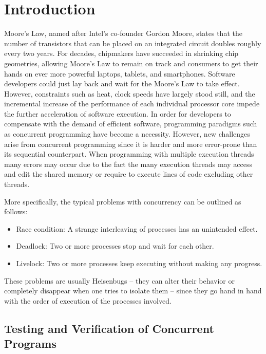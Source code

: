 \chapter{Introduction}

Moore's Law, named after Intel's co-founder Gordon Moore, states that the number of transistors that can be placed on an integrated circuit doubles
roughly every two years. For decades, chipmakers have succeeded in shrinking chip geometries, allowing Moore's Law to remain on track and consumers to 
get their hands on ever more powerful laptops, tablets, and smartphones. Software developers could just lay back and wait for the Moore's Law to take effect.
However, constraints such as heat, clock speeds have largely stood still, and the incremental increase of the performance of each individual 
processor core impede the further acceleration of software execution. In order for developers to compensate with the demand of efficient software, programming paradigms such
as concurrent programming have become a necessity. However, new challenges arise from concurrent programming since it is harder and more
error-prone than its sequential counterpart. When programming with multiple execution threads many errors may occur due to the fact the many execution threads 
may access and edit the shared memory or require to execute lines of code excluding other threads.

More specifically, the typical problems with concurrency can be outlined as follows:
\begin{itemize}
\item Race condition: A strange interleaving of processes has an unintended effect.
\item Deadlock: Two or more processes stop and wait for each other.
\item Livelock: Two or more processes keep executing without making any progress.
\end{itemize}

These problems are usually Heisenbugs \cite{Musu08} – they can alter their behavior or completely
disappear when one tries to isolate them – since they go hand in hand with the order of
execution of the processes involved.

\section{Testing and Verification of Concurrent Programs}

